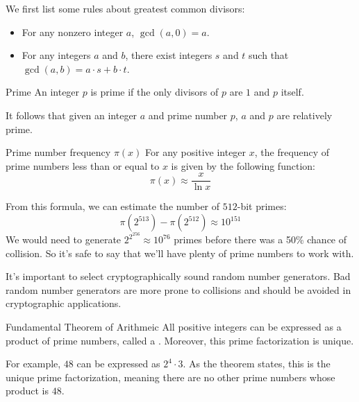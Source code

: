 


We first list some rules about greatest common divisors:
\begin{itemize}[noitemsep]
    \item For any nonzero integer $a$, $\gcd(a,0) = a$.
    \item For any integers $a$ and $b$, there exist integers $s$ and $t$ such that $\gcd(a,b) = a \cdot s + b \cdot t$.
\end{itemize}

\begin{dfnbox}{Prime}{}
    An integer $p$ is prime if the only divisors of $p$ are $1$ and $p$ itself.
\end{dfnbox}

It follows that given an integer $a$ and prime number $p$, $a$ and $p$ are relatively prime.

\begin{tecbox}{Prime number frequency $\pi(x)$}{}
    For any positive integer $x$, the frequency of prime numbers less than or equal to $x$ is given by the following function:
    \[ \pi(x) \approx \frac{x}{\ln x} \]
\end{tecbox}

From this formula, we can estimate the number of $512$-bit primes:
\[ \pi\left(2^{513}\right) - \pi \left(2^{512} \right) \approx 10^{151} \]
We would need to generate $2^{2^{256}} \approx 10^{76}$ primes before there was a 50\% chance of collision. So it's safe to say that we'll have plenty of prime numbers to work with.

\begin{notebox}
    It's important to select cryptographically sound random number generators. Bad random number generators are more prone to collisions and should be avoided in cryptographic applications.
\end{notebox}

\begin{thmbox}{Fundamental Theorem of Arithmeic}{}
    All positive integers can be expressed as a product of prime numbers, called a . Moreover, this prime factorization is unique.
\end{thmbox}

For example, $48$ can be expressed as $2^4 \cdot 3$. As the theorem states, this is the unique prime factorization, meaning there are no other prime numbers whose product is $48$.

